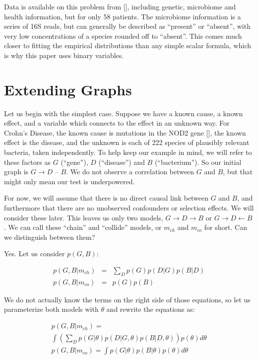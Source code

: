 \documentclass[letterpaper]{article}
\begin{document}
Data is available on this problem from [\cite{data}], including
genetic, microbiome and
health information, but for only 58 patients.  The microbiome
information is a series of 16S reads, but can generally be described
as ``present'' or ``absent'', with very low concentrations of a
species rounded off to ``absent''.  This comes much closer to fitting
the empirical distributions than any simple scalar formula, which is
why this paper uses binary variables.

\section{Extending Graphs}

Let us begin with the simplest case.  Suppose we have a known cause, a
known effect, and a variable which connects to the effect in an
unknown way.   For Crohn's Disease, the known cause is mutations in the NOD2
gene [\cite{nod2}], the known effect is the disease, and the unknown
is each of 222 species of plausibly relevant bacteria, taken
independently.  To help keep our example in mind, we will refer to
these factors as $G$ (``gene''), $D$ (``disease'') and $B$
(``bacterium'').  So our initial graph is $G \rightarrow D$ -- $B$.
We do not observe a
correlation between $G$ and $B$, but that might only mean our test is
underpowered.  

For now, we will assume that there is no direct causal
link between $G$ and $B$, and furthermore that there are no unobserved
confounders or selection effects.  We will consider these later.
This leaves us only two models, $G \rightarrow D \rightarrow B$ or $G
\rightarrow D \leftarrow B$.  We can call these ``chain'' and
``collide'' models, or $m_{ch}$ and $m_{co}$ for short.  Can we
distinguish between them?

Yes.  Let us consider
$p(G,B)$:

\begin{eqnarray*}
p(G,B|m_{ch}) & = & \sum_D p(G)p(D|G)p(B|D) \\
p(G,B|m_{co}) & = & p(G)p(B)
\end{eqnarray*}

We do not actually know the terms on the right side of those
equations, so let us parameterize both models with $\theta$ and
rewrite the equations as:


\begin{multline*}
  p(G,B|m_{ch}) = \\
  \int \left ( \sum_D p(G|\theta) p(D|G,\theta) 
  p(B|D,\theta) \right ) p(\theta) d\theta \\
  p(G,B|m_{co}) = \int p(G|\theta)p(B|\theta)p(\theta) d\theta
\end{multline*}
\end{document}
